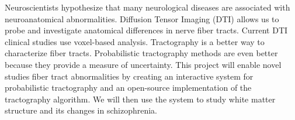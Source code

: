 % 
% 
%
Neuroscientists hypothesize that many neurological diseases are associated with neuroanatomical abnormalities.  Diffusion Tensor Imaging (DTI) allows us to probe and investigate anatomical differences in nerve fiber tracts. Current DTI clinical studies use voxel-based analysis.  Tractography is a better way to characterize fiber tracts.  Probabilistic tractography methods are even better because they provide a measure of uncertainty.  This project will enable novel studies fiber tract abnormalities by creating an interactive system for probabilistic tractography and an open-source implementation of the tractography algorithm. We will then use the system to study white matter structure and its changes in schizophrenia.
